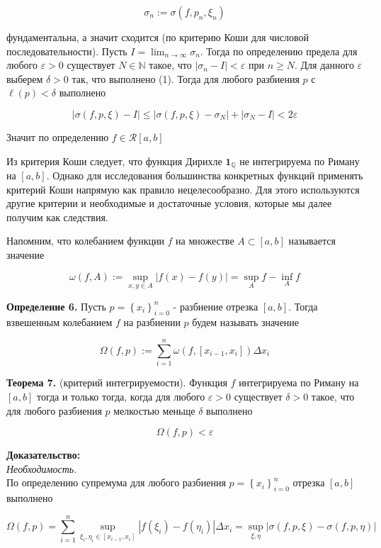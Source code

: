 \documentclass[a4paper,12pt]{article} %
\begin{document}
	$$
	\sigma_{n}:=\sigma\left(f, p_{n}, \xi_{n}\right)
	$$
	
	фундаментальна, а значит сходится (по критерию Коши для числовой последовательности). Пусть $I=\lim _{n \rightarrow \infty} \sigma_{n}$. Тогда по определению предела для любого $\varepsilon>0$ существует $N \in \mathbb{N}$ такое, что $\left|\sigma_{n}-I\right|<\varepsilon$ при $n \geq N$. Для данного $\varepsilon$ выберем $\delta>0$ так, что выполнено (1). Тогда для любого разбиения $p$ с $\ell(p)<\delta$ выполнено
	
	$$
	|\sigma(f, p, \xi)-I| \leq\left|\sigma(f, p, \xi)-\sigma_{N}\right|+\left|\sigma_{N}-I\right|<2 \varepsilon
	$$
	
	Значит по определению $f \in \mathcal{R}[a, b]$
	
	Из критерия Коши следует, что функция Дирихле $\mathbf{1}_{\mathbb{Q}}$ не интегрируема по Риману на $[a, b]$. Однако для исследования большинства конкретных функций применять критерий Коши напрямую как правило нецелесообразно. Для этого используются другие критерии и необходимые и достаточные условия, которые мы далее получим как следствия.
	
	Напомним, что колебанием функции $f$ на множестве $A \subset[a, b]$ называется значение
	
	$$
	\omega(f, A):=\sup _{x, y \in A}|f(x)-f(y)|=\sup _{A} f-\inf _{A} f
	$$
	
	\textbf{Определение 6.} Пусть $p=\left\{x_{i}\right\}_{i=0}^{n}$ - разбиение отрезка $[a, b]$. Тогда взвешенным колебанием $f$ на разбиении $p$ будем называть значение
	
	$$
	\Omega(f, p):=\sum_{i=1}^{n} \omega\left(f,\left[x_{i-1}, x_{i}\right]\right) \Delta x_{i}
	$$
	
	\textbf{Теорема 7.} (критерий интегрируемости). Функция $f$ интегрируема по Риману на $[a, b]$ тогда и только тогда, когда для любого $\varepsilon>0$ существует $\delta>0$ такое, что для любого разбиения $p$ мелкостью меньще $\delta$ выполнено
	
	$$
	\Omega(f, p)<\varepsilon
	$$
	
	\textbf{Доказательство:\\}
	\textit{Необходимость.}\\ По определению супремума для любого разбиения $p=\left\{x_{i}\right\}_{i=0}^{n}$ отрезка $[a, b]$ выполнено
	
	$$
	\Omega(f, p)=\sum_{i=1}^{n} \sup _{\xi_{i}, \eta_{i} \in\left[x_{i-1}, x_{i}\right]}\left|f\left(\xi_{i}\right)-f\left(\eta_{i}\right)\right| \Delta x_{i}=\sup _{\xi, \eta}|\sigma(f, p, \xi)-\sigma(f, p, \eta)|
	$$
	
\end{document}
